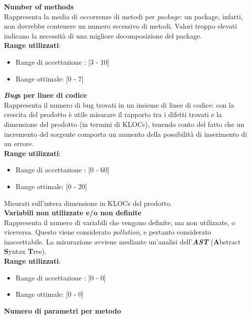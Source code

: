 \textbf{Number of methods}\\

Rappresenta la media di occorrenze di metodi per \textit{package}: un package, infatti, non dovrebbe contenere un numero eccessivo di metodi. Valori troppo elevati indicano la necessit\`a di una migliore decomposizione del package. \\

\textbf{Range utilizzati}:
\begin{itemize}
	\item Range di accettazione : [3 - 10]
	\item Range ottimale: [0 - 7]
\end{itemize}

\textbf{\textit{Bug}s per linee di codice}\\

Rappresenta il numero di bug trovati in un insieme di linee di codice: con la crescita del prodotto \`e utile misurare il rapporto tra i difetti trovati e la dimensione del prodotto (in termini di KLOCs), tenendo conto del fatto che un incremento del sorgente comporta un aumento della possibilit\`a di inserimento di un errore. \\

\textbf{Range utilizzati}:
\begin{itemize}
	\item Range di accettazione : [0 - 60]
	\item Range ottimale: [0 - 20]
\end{itemize}
Misurati sull'intera dimensione in KLOCs del prodotto.\\

\textbf{Variabili non utilizzate e/o non definite}\\

Rappresenta il numero di variabili che vengono definite, ma non utilizzate, o viceversa. Questo viene considerato \textit{pollution}, e pertanto considerato inaccettabile. La misurazione avviene mediante un'analisi dell'\textbf{\textit{AST}} (\textbf{A}bstract \textbf{S}yntax \textbf{T}ree). \\

\textbf{Range utilizzati}:
\begin{itemize}
	\item Range di accettazione : [0 - 0]
	\item Range ottimale: [0 - 0]
\end{itemize}


\textbf{Numero di parametri per metodo}\\

